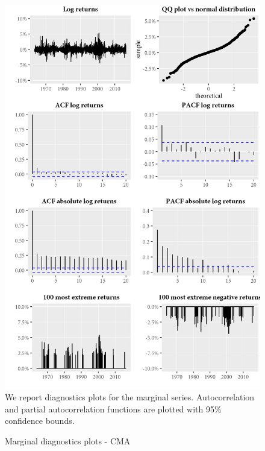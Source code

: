 \begin{figure}[H]
  \caption{Marginal diagnostics plots - CMA}
  \label{diag:marginaldiagCMA}
  \centering
  \begin{minipage}{\textwidth}
  \includegraphics[scale=1]{graphics/marginal/MarginalStats.CMA.Estim.png}  
  \vspace{3mm}
  \footnotesize
  We report diagnostics plots for the marginal series. Autocorrelation and partial autocorrelation functions are plotted with 95\% confidence bounds. 
  \end{minipage}
\end{figure}
